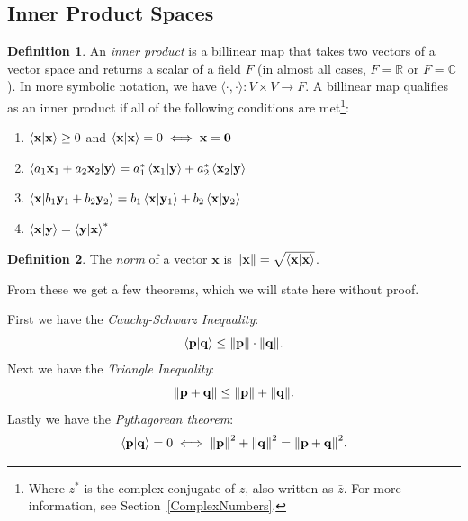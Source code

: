 \documentclass[a4paper]{article}
\numberwithin{equation}{subsection}
\theoremstyle{definition}
\newtheorem{definition}{Definition}[section]
\theoremstyle{remark}
\newenvironment{definitionSR}
{
\begin{siderules}
\begin{definition}
}
{
\end{definition}
\end{siderules}
}
\newcommand{\Reals}{\mathbb{R}}
\newcommand{\Complex}{\mathbb{C}}
\newcommand{\ve}[1]{
	\mathbf{#1}
}
\begin{document}
\subsection{Inner Product Spaces}

\begin{definitionSR}
An \textit{inner product} is a billinear map that takes two vectors of a vector space and returns a scalar of a field $F$ (in almost all cases, $F=\Reals$ or $F=\Complex$).
In more symbolic notation, we have $\langle \cdot , \cdot \rangle : V \times V \to F$. A billinear map qualifies as an inner product if all of the following conditions are
met\footnote{Where $z^*$ is the complex conjugate of $z$, also written as $\bar{z}$. For more information, see Section~\ref{ComplexNumbers}.}:
\begin{enumerate}
\item $\braket{\ve{x}}{\ve{x}} \geq 0$ and $\braket{\ve{x}}{\ve{x}} = 0 \iff \ve{x} = \ve{0}$
\item $\braket{a_1\ve{x}_1 + a_2\ve{x}_2}{\ve{y}} = a_1^*\braket{\ve{x}_1}{\ve{y}} + a_2^*\braket{\ve{x}_2}{\ve{y}}$
\item $\braket{\ve{x}}{b_1\ve{y}_1 + b_2\ve{y}_2} = b_1\braket{\ve{x}}{\ve{y}_1} + b_2\braket{\ve{x}}{\ve{y}_2}$
\item $\braket{\ve{x}}{\ve{y}} = \braket{\ve{y}}{\ve{x}}^*$
\end{enumerate}

\end{definitionSR}
\begin{definitionSR}
The \textit{norm} of a vector $\ve{x}$ is $\norm{\ve{x}} = \sqrt{\braket{\ve{x}}{\ve{x}}}$.
\end{definitionSR}

From these we get a few theorems, which we will state here without proof.

First we have the \textit{Cauchy-Schwarz Inequality}:
\begin{equation}
\braket{\ve{p}}{\ve{q}} \leq \norm{\ve{p}}\cdot\norm{\ve{q}}.
\end{equation}
Next we have the \textit{Triangle Inequality}:
\begin{equation}
\norm{\ve{p} + \ve{q}} \leq \norm{\ve{p}} + \norm{\ve{q}}.
\end{equation}
Lastly we have the \textit{Pythagorean theorem}:
\begin{equation}
\braket{\ve{p}}{\ve{q}} = 0 \iff \norm{\ve{p}}^2 + \norm{\ve{q}}^2 = \norm{\ve{p} + \ve{q}}^2.
\end{equation}
\end{document}
